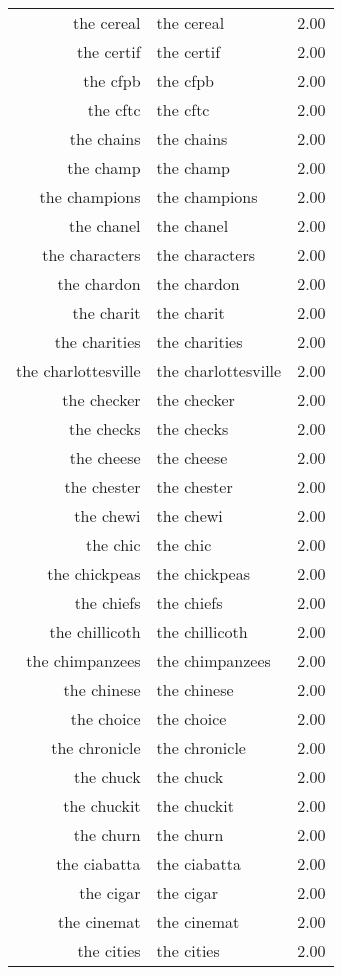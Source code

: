 \begin{table}[ht]
\begin{tabular}{rlr}
  the cereal & the cereal & 2.00 \\ 
  the certif & the certif & 2.00 \\ 
  the cfpb & the cfpb & 2.00 \\ 
  the cftc & the cftc & 2.00 \\ 
  the chains & the chains & 2.00 \\ 
  the champ & the champ & 2.00 \\ 
  the champions & the champions & 2.00 \\ 
  the chanel & the chanel & 2.00 \\ 
  the characters & the characters & 2.00 \\ 
  the chardon & the chardon & 2.00 \\ 
  the charit & the charit & 2.00 \\ 
  the charities & the charities & 2.00 \\ 
  the charlottesville & the charlottesville & 2.00 \\ 
  the checker & the checker & 2.00 \\ 
  the checks & the checks & 2.00 \\ 
  the cheese & the cheese & 2.00 \\ 
  the chester & the chester & 2.00 \\ 
  the chewi & the chewi & 2.00 \\ 
  the chic & the chic & 2.00 \\ 
  the chickpeas & the chickpeas & 2.00 \\ 
  the chiefs & the chiefs & 2.00 \\ 
  the chillicoth & the chillicoth & 2.00 \\ 
  the chimpanzees & the chimpanzees & 2.00 \\ 
  the chinese & the chinese & 2.00 \\ 
  the choice & the choice & 2.00 \\ 
  the chronicle & the chronicle & 2.00 \\ 
  the chuck & the chuck & 2.00 \\ 
  the chuckit & the chuckit & 2.00 \\ 
  the churn & the churn & 2.00 \\ 
  the ciabatta & the ciabatta & 2.00 \\ 
  the cigar & the cigar & 2.00 \\ 
  the cinemat & the cinemat & 2.00 \\ 
  the cities & the cities & 2.00 \\ 

\end{tabular}
\end{table}
